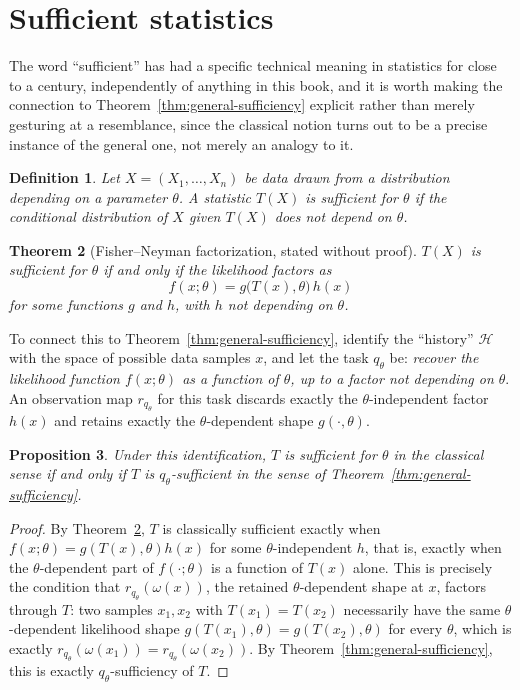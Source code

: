 \documentclass[11pt]{book}
\newtheorem{theorem}{Theorem}[chapter]
\newtheorem{proposition}[theorem]{Proposition}
\newtheorem{definition}[theorem]{Definition}
\begin{document}
\section{Sufficient statistics}

The word ``sufficient'' has had a specific technical meaning in statistics for close to a century, independently of anything in this book, and it is worth making the connection to Theorem~\ref{thm:general-sufficiency} explicit rather than merely gesturing at a resemblance, since the classical notion turns out to be a precise instance of the general one, not merely an analogy to it.

\begin{definition}
Let $X=(X_1,\ldots,X_n)$ be data drawn from a distribution depending on a parameter $\theta$. A statistic $T(X)$ is \emph{sufficient for $\theta$} if the conditional distribution of $X$ given $T(X)$ does not depend on $\theta$.
\end{definition}

\begin{theorem}[Fisher--Neyman factorization, stated without proof]
\label{thm:factorization}
$T(X)$ is sufficient for $\theta$ if and only if the likelihood factors as
\[
f(x;\theta) = g\bigl(T(x),\theta\bigr)\, h(x)
\]
for some functions $g$ and $h$, with $h$ not depending on $\theta$.
\end{theorem}

To connect this to Theorem~\ref{thm:general-sufficiency}, identify the ``history'' $\mathcal H$ with the space of possible data samples $x$, and let the task $q_\theta$ be: \emph{recover the likelihood function $f(x;\theta)$ as a function of $\theta$, up to a factor not depending on $\theta$}. An observation map $r_{q_\theta}$ for this task discards exactly the $\theta$-independent factor $h(x)$ and retains exactly the $\theta$-dependent shape $g(\cdot,\theta)$.

\begin{proposition}
\label{prop:sufficiency-identification}
Under this identification, $T$ is sufficient for $\theta$ in the classical sense if and only if $T$ is $q_\theta$-sufficient in the sense of Theorem~\ref{thm:general-sufficiency}.
\end{proposition}
\begin{proof}
By Theorem~\ref{thm:factorization}, $T$ is classically sufficient exactly when $f(x;\theta)=g(T(x),\theta)h(x)$ for some $\theta$-independent $h$, that is, exactly when the $\theta$-dependent part of $f(\cdot;\theta)$ is a function of $T(x)$ alone. This is precisely the condition that $r_{q_\theta}(\omega(x))$, the retained $\theta$-dependent shape at $x$, factors through $T$: two samples $x_1,x_2$ with $T(x_1)=T(x_2)$ necessarily have the same $\theta$-dependent likelihood shape $g(T(x_1),\theta)=g(T(x_2),\theta)$ for every $\theta$, which is exactly $r_{q_\theta}(\omega(x_1))=r_{q_\theta}(\omega(x_2))$. By Theorem~\ref{thm:general-sufficiency}, this is exactly $q_\theta$-sufficiency of $T$.
\end{proof}
\end{document}
